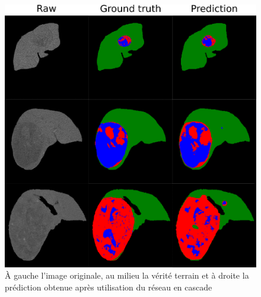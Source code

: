 \documentclass[]{memoir}
\begin{document}
\begin{figure}
\centering
\includegraphics[width=0.7\linewidth]{images/prediction_pres}
\caption{À gauche l’image originale, au milieu la vérité terrain et à droite la prédiction obtenue après utilisation du réseau en cascade}
\label{fig:prediction_pres}
\end{figure}
\end{document}
